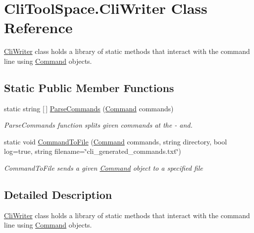 \hypertarget{class_cli_tool_space_1_1_cli_writer}{}\section{Cli\+Tool\+Space.\+Cli\+Writer Class Reference}
\label{class_cli_tool_space_1_1_cli_writer}


\mbox{\hyperlink{class_cli_tool_space_1_1_cli_writer}{Cli\+Writer}} class holds a library of static methods that interact with the command line using \mbox{\hyperlink{class_cli_tool_space_1_1_command}{Command}} objects.  


\subsection*{Static Public Member Functions}
\begin{DoxyCompactItemize}
\item 
static string \mbox{[}$\,$\mbox{]} \mbox{\hyperlink{class_cli_tool_space_1_1_cli_writer_a7c587bdbc44db571a9e95db4465d31ee}{Parse\+Commands}} (\mbox{\hyperlink{class_cli_tool_space_1_1_command}{Command}} commands)
\begin{DoxyCompactList}\small\item\em Parse\+Commands function splits given commands at the -\/ and. \end{DoxyCompactList}\item 
static void \mbox{\hyperlink{class_cli_tool_space_1_1_cli_writer_ad29fa767b7b1503aeef2a2353ccde068}{Command\+To\+File}} (\mbox{\hyperlink{class_cli_tool_space_1_1_command}{Command}} commands, string directory, bool log=true, string filename=\char`\"{}cli\+\_\+generated\+\_\+commands.\+txt\char`\"{})
\begin{DoxyCompactList}\small\item\em Command\+To\+File sends a given \mbox{\hyperlink{class_cli_tool_space_1_1_command}{Command}} object to a specified file \end{DoxyCompactList}\end{DoxyCompactItemize}


\subsection{Detailed Description}
\mbox{\hyperlink{class_cli_tool_space_1_1_cli_writer}{Cli\+Writer}} class holds a library of static methods that interact with the command line using \mbox{\hyperlink{class_cli_tool_space_1_1_command}{Command}} objects. 



